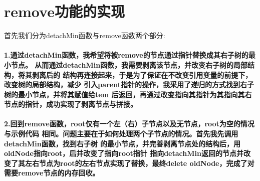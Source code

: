 \documentclass[UTF8]{ctexart}
\begin{document}
\pagestyle{fancy}
\fancyhead{}
\setlength{\headheight}{12.64723pt}

\section{remove功能的实现}
首先我们分为detachMin函数与remove函数两个部分: \par
\paragraph{
1.通过detachMin函数，我希望将被remove的节点通过指针替换成其右子树的最小节点。
从而通过detachMin函数，我需要剥离该节点，并改变右子树的局部结构，将其剥离后的
结构再连接起来，于是为了保证在不改变引用变量的前提下，改变树的局部结构，减少
引入parent指针的操作，我采用了递归的方式找到右子树的最小节点，并将其赋值给tem
后返回，再通过改变指向其指针为其指向其右节点的指针，成功实现了剥离节点与拼接。}

\paragraph{2.回到remove函数，root仅有一个左（右）子节点以及无节点，root为空的情况与示例代码
相同。问题主要在于如何处理两个子节点的情况。首先我先调用detachMin函数，找到右子树
的最小节点，并完善剥离节点处的结构后，用oldNode指向root，后并改变了指向root指针
指向detachMin返回的节点并改变了其左右节点为root的左右节点实现了替换，最终delete
oldNode，完成了对需要remove节点的内存回收。}
\end{document}

